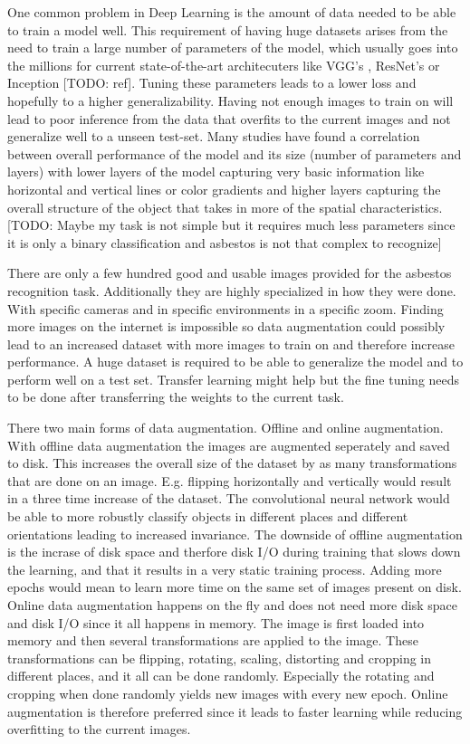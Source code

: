 One common problem in Deep Learning is the amount of data needed to be able to train a model well. This requirement of having huge datasets arises from the need to train a large number of parameters of the model, which usually goes into the millions for current state-of-the-art architecuters like VGG's \cite{simonyan2014very}, ResNet's \cite{he2016deep} or Inception [TODO: ref]. Tuning these parameters leads to a lower loss and hopefully to a higher generalizability. Having not enough images to train on will lead to poor inference from the data that overfits to the current images and not generalize well to a unseen test-set. Many studies have found a correlation between overall performance of the model and its size (number of parameters and layers) with lower layers of the model capturing very basic information like horizontal and vertical lines or color gradients and higher layers capturing the overall structure of the object that takes in more of the spatial characteristics. [TODO: Maybe my task is not simple but it requires much less parameters since it is only a binary classification and asbestos is not that complex to recognize]

There are only a few hundred good and usable images provided for the asbestos recognition task. Additionally they are highly specialized in how they were done. With specific cameras and in specific environments in a specific zoom. Finding more images on the internet is impossible so data augmentation could possibly lead to an increased dataset with more images to train on and therefore increase performance. A huge dataset is required to be able to generalize the model and to perform well on a test set. Transfer learning might help but the fine tuning needs to be done after transferring the weights to the current task.

There two main forms of data augmentation. Offline and online augmentation. With offline data augmentation the images are augmented seperately and saved to disk. This increases the overall size of the dataset by as many transformations that are done on an image. E.g. flipping horizontally and vertically would result in a three time increase of the dataset. The convolutional neural network would be able to more robustly classify objects in different places and different orientations leading to increased invariance. The downside of offline augmentation is the incrase of disk space and therfore disk I/O during training that slows down the learning, and that it results in a very static training process. Adding more epochs would mean to learn more time on the same set of images present on disk.
Online data augmentation happens on the fly and does not need more disk space and disk I/O since it all happens in memory. The image is first loaded into memory and then several transformations are applied to the image. These transformations can be flipping, rotating, scaling, distorting and cropping in different places, and it all can be done randomly. Especially the rotating and cropping when done randomly yields new images with every new epoch. Online augmentation is therefore preferred since it leads to faster learning while reducing overfitting to the current images.


